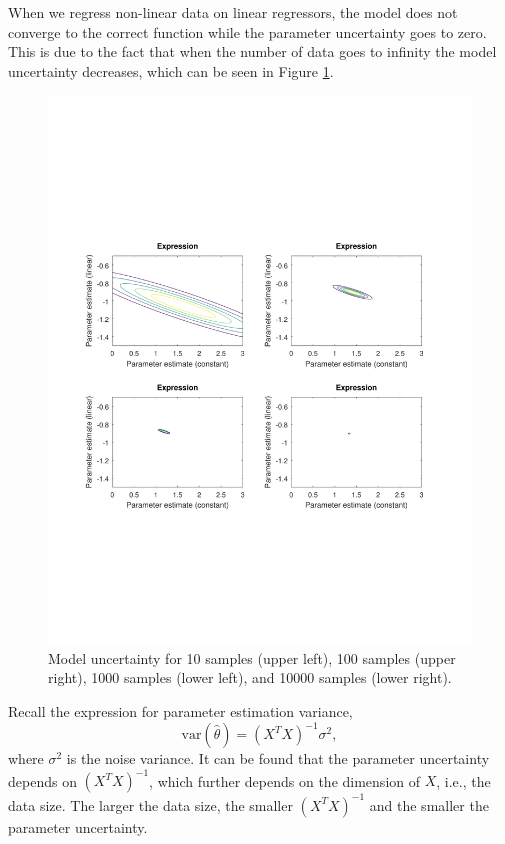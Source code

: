 \documentclass[]{article}
\begin{document}
When we regress non-linear data on linear regressors, the model does not converge to the correct function while the parameter uncertainty goes to zero. This is due to the fact that when the number of data goes to infinity the model uncertainty decreases, which can be seen in Figure \ref{fig:uncertainty_lim}. 
\begin{figure}[ht]
	\centering
	\includegraphics[trim= 10cm 5cm 10cm 5cm, scale=0.4]{proj1-3_2a}
	\caption{Model uncertainty for 10 samples (upper left), 100 samples (upper right), 1000 samples (lower left), and 10000 samples (lower right).}
	\label{fig:uncertainty_lim}
\end{figure}
Recall the expression for parameter estimation variance,
\begin{equation}
\text{var}(\hat{\theta}) = (X^TX)^{-1}\sigma^2,
\end{equation}
where $\sigma^2$ is the noise variance. It can be found that the parameter uncertainty depends on $(X^TX)^{-1}$, which further depends on the dimension of $X$, i.e., the data size. The larger the data size, the smaller $(X^TX)^{-1}$ and the smaller the parameter uncertainty. 
\end{document}
